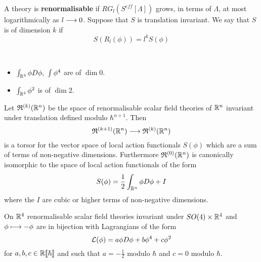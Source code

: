 \begin{definition}
  A theory is \textbf{renormalisable} if $RG_l(S^{eff}[\Lambda])$ grows, in terms of $\Lambda$, at most logarithmically as $l \longrightarrow 0$. Suppose that $S$ is translation invariant. We say that $S$ is of dimension $k$ if
  $$ S(R_l(\phi)) = l^k S(\phi) $$
\end{definition}

\begin{example}~
  \begin{itemize}
    \item $\int_{\RR^4} \phi D \phi, \ \int \phi^4$ are of $\dim 0$.
    \item $\int_{\RR^4} \phi^2$ is of $\dim 2$.
  \end{itemize}
\end{example}

\begin{theo}
  Let $\mathfrak{R}^{(k)}(\mathbb{R}^n)$ be the space of renormalisable scalar field theories of $\mathbb{R}^n$ invariant under translation defined modulo $\hbar^{n+1}$. Then
  $$  \mathfrak{R}^{(k+1)}(\mathbb{R}^n) \longrightarrow \mathfrak{R}^{(k)}(\mathbb{R}^n)$$
  is a torsor for the vector space of local action functionals $S(\phi)$ which are a sum of terms of non-negative dimensions. Furthermore $\mathfrak{R}^{(0)}(\mathbb{R}^n)$ is canonically isomorphic to the space of local action functionals of the form
  $$ S(\phi) = \frac{1}{2} \int_{\RR^n} \phi D \phi + I $$
  where the $I$ are cubic or higher terms of non-negative dimensions.
\end{theo}

\begin{corollary}
  On $\mathbb{R}^4$ renormalisable scalar field theories invariant under $SO(4) \times \mathbb{R}^4$ and $\phi \lmap -\phi$ are in bijection with Lagrangians of the form
  $$ \LL (\phi) = a \phi D \phi + b \phi^4 + c \phi^2 $$
  for $a,b,c \in \mathbb{R}\llbracket\hbar \rrbracket$ and such that $a = - \frac{1}{2}$ modulo $\hbar$ and $c = 0$ modulo $\hbar$.
\end{corollary}




\newpage
